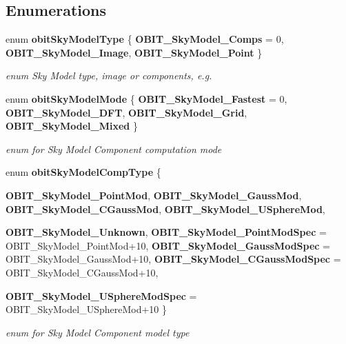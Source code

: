 \subsection*{Enumerations}
\begin{CompactItemize}
\item 
enum {\bf obit\-Sky\-Model\-Type} \{ {\bf OBIT\_\-Sky\-Model\_\-Comps} = 0, 
{\bf OBIT\_\-Sky\-Model\_\-Image}, 
{\bf OBIT\_\-Sky\-Model\_\-Point}
 \}
\begin{CompactList}\small\item\em enum Sky Model type, image or components, e.g. \item\end{CompactList}\item 
enum {\bf obit\-Sky\-Model\-Mode} \{ {\bf OBIT\_\-Sky\-Model\_\-Fastest} = 0, 
{\bf OBIT\_\-Sky\-Model\_\-DFT}, 
{\bf OBIT\_\-Sky\-Model\_\-Grid}, 
{\bf OBIT\_\-Sky\-Model\_\-Mixed}
 \}
\begin{CompactList}\small\item\em enum for Sky Model Component computation mode \item\end{CompactList}\item 
enum {\bf obit\-Sky\-Model\-Comp\-Type} \{ \par
{\bf OBIT\_\-Sky\-Model\_\-Point\-Mod}, 
{\bf OBIT\_\-Sky\-Model\_\-Gauss\-Mod}, 
{\bf OBIT\_\-Sky\-Model\_\-CGauss\-Mod}, 
{\bf OBIT\_\-Sky\-Model\_\-USphere\-Mod}, 
\par
{\bf OBIT\_\-Sky\-Model\_\-Unknown}, 
{\bf OBIT\_\-Sky\-Model\_\-Point\-Mod\-Spec} =  OBIT\_\-Sky\-Model\_\-Point\-Mod+10, 
{\bf OBIT\_\-Sky\-Model\_\-Gauss\-Mod\-Spec} =  OBIT\_\-Sky\-Model\_\-Gauss\-Mod+10, 
{\bf OBIT\_\-Sky\-Model\_\-CGauss\-Mod\-Spec} =  OBIT\_\-Sky\-Model\_\-CGauss\-Mod+10, 
\par
{\bf OBIT\_\-Sky\-Model\_\-USphere\-Mod\-Spec} =  OBIT\_\-Sky\-Model\_\-USphere\-Mod+10
 \}
\begin{CompactList}\small\item\em enum for Sky Model Component model type \item\end{CompactList}\end{CompactItemize}
